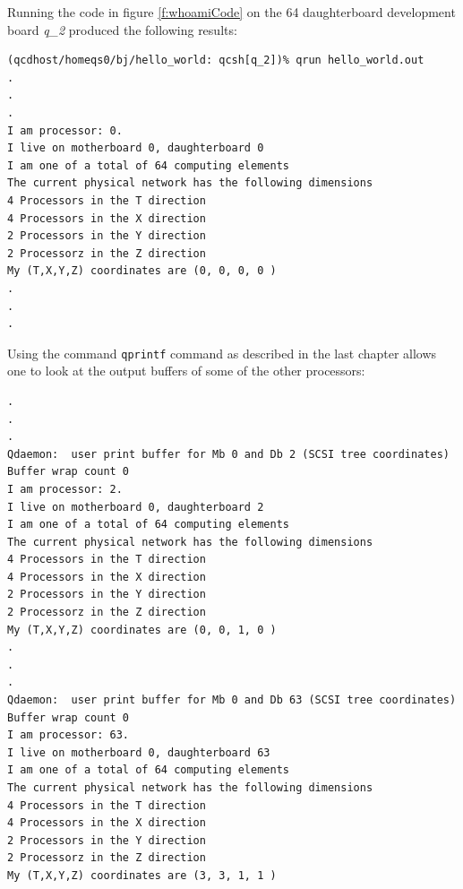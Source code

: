 Running the code in figure \ref{f:whoamiCode} on the 64 daughterboard 
development board {\em q\_2} produced the following results:
{
\scriptsize
\begin{verbatim}
(qcdhost/homeqs0/bj/hello_world: qcsh[q_2])% qrun hello_world.out
.
.
.
I am processor: 0.
I live on motherboard 0, daughterboard 0
I am one of a total of 64 computing elements
The current physical network has the following dimensions
4 Processors in the T direction
4 Processors in the X direction
2 Processors in the Y direction
2 Processorz in the Z direction
My (T,X,Y,Z) coordinates are (0, 0, 0, 0 )
.
.
.
\end{verbatim}
}

Using the command {\tt qprintf} command as described in the last chapter
allows one to look at the output buffers of some of the other processors:
{\scriptsize
\begin{verbatim}
.
.
.
Qdaemon:  user print buffer for Mb 0 and Db 2 (SCSI tree coordinates)
Buffer wrap count 0
I am processor: 2.
I live on motherboard 0, daughterboard 2
I am one of a total of 64 computing elements
The current physical network has the following dimensions
4 Processors in the T direction
4 Processors in the X direction
2 Processors in the Y direction
2 Processorz in the Z direction
My (T,X,Y,Z) coordinates are (0, 0, 1, 0 )
.
.
.
Qdaemon:  user print buffer for Mb 0 and Db 63 (SCSI tree coordinates)
Buffer wrap count 0
I am processor: 63.
I live on motherboard 0, daughterboard 63
I am one of a total of 64 computing elements
The current physical network has the following dimensions
4 Processors in the T direction
4 Processors in the X direction
2 Processors in the Y direction
2 Processorz in the Z direction
My (T,X,Y,Z) coordinates are (3, 3, 1, 1 )
\end{verbatim}
}

